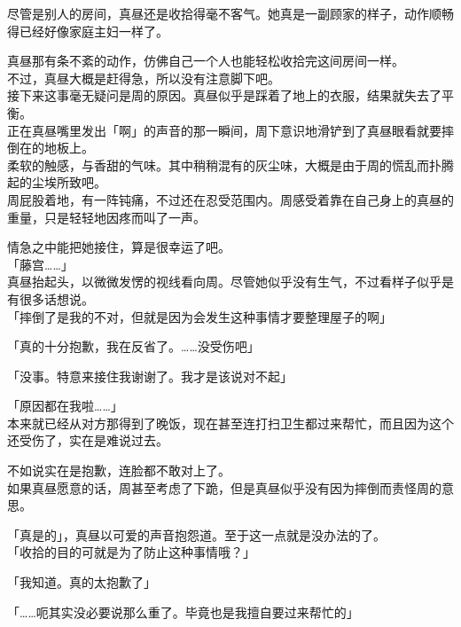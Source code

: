 尽管是别人的房间，真昼还是收拾得毫不客气。她真是一副顾家的样子，动作顺畅得已经好像家庭主妇一样了。

真昼那有条不紊的动作，仿佛自己一个人也能轻松收拾完这间房间一样。\\

不过，真昼大概是赶得急，所以没有注意脚下吧。\\

接下来这事毫无疑问是周的原因。真昼似乎是踩着了地上的衣服，结果就失去了平衡。\\

正在真昼嘴里发出「啊」的声音的那一瞬间，周下意识地滑铲到了真昼眼看就要摔倒在的地板上。\\

柔软的触感，与香甜的气味。其中稍稍混有的灰尘味，大概是由于周的慌乱而扑腾起的尘埃所致吧。\\

周屁股着地，有一阵钝痛，不过还在忍受范围内。周感受着靠在自己身上的真昼的重量，只是轻轻地因疼而叫了一声。

情急之中能把她接住，算是很幸运了吧。\\

「藤宫……」\\

真昼抬起头，以微微发愣的视线看向周。尽管她似乎没有生气，不过看样子似乎是有很多话想说。\\

「摔倒了是我的不对，但就是因为会发生这种事情才要整理屋子的啊」

「真的十分抱歉，我在反省了。……没受伤吧」

「没事。特意来接住我谢谢了。我才是该说对不起」

「原因都在我啦……」\\

本来就已经从对方那得到了晚饭，现在甚至连打扫卫生都过来帮忙，而且因为这个还受伤了，实在是难说过去。

不如说实在是抱歉，连脸都不敢对上了。\\

如果真昼愿意的话，周甚至考虑了下跪，但是真昼似乎没有因为摔倒而责怪周的意思。

「真是的」，真昼以可爱的声音抱怨道。至于这一点就是没办法的了。\\

「收拾的目的可就是为了防止这种事情哦？」

「我知道。真的太抱歉了」

「……呃其实没必要说那么重了。毕竟也是我擅自要过来帮忙的」\\

